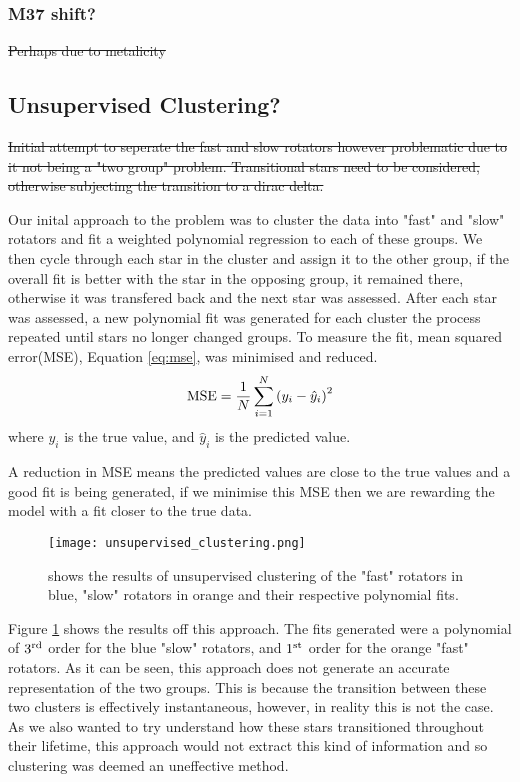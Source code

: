 \documentclass[fleqn,usenatbib]{mnras}
\begin{document}
\subsubsection{M37 shift?}
\sout{Perhaps due to metalicity}

\subsection{Unsupervised Clustering?}
\sout{Initial attempt to seperate the fast and slow rotators however problematic due to it not being a "two group" problem.
	Transitional stars need to be considered, otherwise subjecting the transition to a dirac delta.}

Our inital approach to the problem was to cluster the data into "fast" and "slow" rotators and fit a weighted polynomial regression to each of these groups.
We then cycle through each star in the cluster and assign it to the other group, if the overall fit is better with the star in the opposing group, it remained there, otherwise it was transfered back and the next star was assessed.
After each star was assessed, a new polynomial fit was generated for each cluster the process repeated until stars no longer changed groups.
To measure the fit, mean squared error(MSE), Equation \ref{eq:mse}, was minimised and reduced.
\begin{equation}
	\label{eq:mse}
	\textup{MSE} = \frac{1}{N}\sum_{i=1}^N \left(y_i - \hat{y}_i\right)^2
\end{equation}
where $y_i$ is the true value, and $\hat{y}_i$ is the predicted value.

A reduction in MSE means the predicted values are close to the true values and a good fit is being generated, if we minimise this MSE then we are rewarding the model with a fit closer to the true data.

\begin{figure}
	\texttt{[image: unsupervised\_clustering.png]}
	\caption{shows the results of unsupervised clustering of the "fast" rotators in blue, "slow" rotators in orange and their respective polynomial fits.}
	\label{fig:unsupervised_clustering}
\end{figure}

Figure \ref{fig:unsupervised_clustering} shows the results off this approach.
The fits generated were a polynomial of $3^\textup{rd}$ order for the blue "slow" rotators, and $1^\textup{st}$ order for the orange "fast" rotators.
As it can be seen, this approach does not generate an accurate representation of the two groups.
This is because the transition between these two clusters is effectively instantaneous, however, in reality this is not the case.
As we also wanted to try understand how these stars transitioned throughout their lifetime, this approach would not extract this kind of information and so clustering was deemed an uneffective method.
\end{document}
